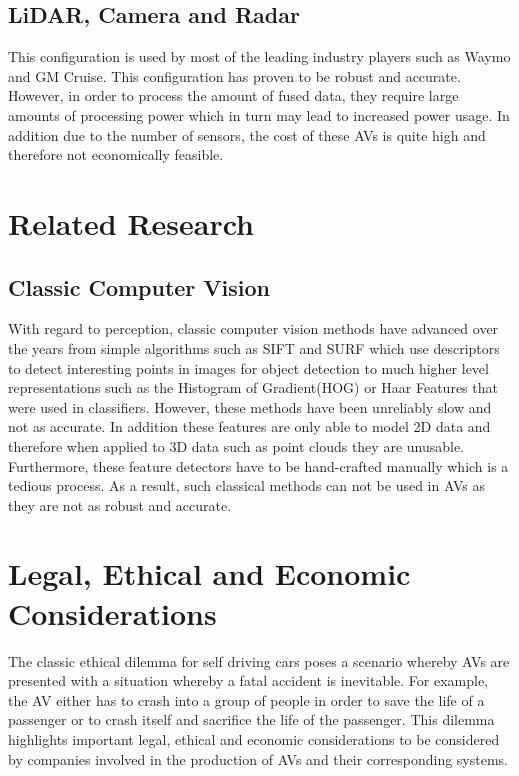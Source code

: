 \subsection{LiDAR, Camera and Radar}
This configuration is used by most of the leading industry players such as Waymo and GM Cruise. This configuration has proven to be robust and accurate.
 However, in order to process the amount of fused data, they require large amounts of processing power which in turn may lead to increased power usage. In addition due to the number of sensors, the cost of these AVs is quite high and therefore not economically feasible. 


\section{Related Research} 
\subsection{Classic Computer Vision}
With regard to perception, classic computer vision methods have advanced over the years from simple algorithms such as SIFT\cite{lowe1999object} and SURF\cite{bay2006surf} which use descriptors to detect interesting points in images for object detection to much higher level representations such as the Histogram of Gradient(HOG)\cite{dalal2005histograms} or Haar Features\cite{viola2001rapid}  that were used in classifiers.  However, these methods have been unreliably slow and not as accurate. In addition these features are only able to model 2D data and therefore when applied to 3D data such as point clouds they are unusable. Furthermore, these feature detectors have to be hand-crafted manually which is a tedious process. As a result,  such classical methods can not be used in AVs as they are not as robust and accurate.  









\section{Legal, Ethical and Economic Considerations}

The classic ethical dilemma for self driving cars poses a scenario whereby AVs are presented with a situation whereby a fatal accident is inevitable. For example, the AV either has to crash into a group of people in order to save the life of a passenger or to crash itself and sacrifice the life of the passenger. This dilemma highlights important legal, ethical and economic considerations to be considered by companies involved in the production of AVs and their corresponding systems. 


